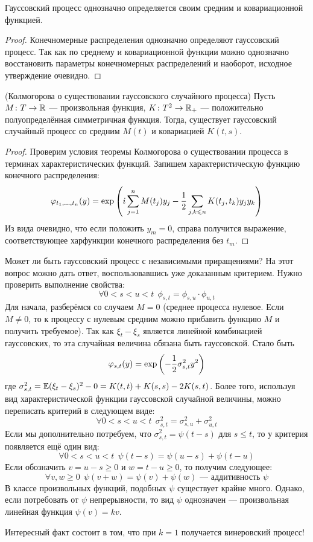 \begin{proposition}
	Гауссовский процесс однозначно определяется своим средним и ковариационной функцией.
\end{proposition}

\begin{proof}
	Конечномерные распределения однозначно определяют гауссовский процесс. Так как по среднему и ковариационной функции можно однозначно восстановить параметры конечномерных распределений и наоборот, исходное утверждение очевидно.
\end{proof}

\begin{theorem} (Колмогорова о существовании гауссовского случайного процесса)
	Пусть $M \colon T \to \mathbb{R}$ --- произвольная функция, $K \colon T^2 \to \mathbb{R}_+$ --- положительно полуопределённая симметричная функция. Тогда, существует гауссовский случайный процесс со средним $M(t)$ и ковариацией $K(t, s)$.
\end{theorem}

\begin{proof}
	Проверим условия теоремы Колмогорова о существовании процесса в терминах характеристических функций. Запишем характеристическую функцию конечного распределения:
	\[
	\varphi_{t_1, \ldots, t_n}(y) = \exp\left(i\sum_{j = 1}^n M(t_j)y_j - \frac{1}{2}\sum_{j, k \leqslant n} K(t_j, t_k)y_jy_k\right)
	\]
	Из вида очевидно, что если положить $y_m = 0$, справа получится выражение, соответствующее харфункции конечного распределения без $t_m$.
\end{proof}

\begin{note}
	Может ли быть гауссовский процесс с независимыми приращениями? На этот вопрос можно дать ответ, воспользовавшись уже доказанным критерием. Нужно проверить выполнение свойства:
	\[
	\forall 0 < s < u < t\ \ \phi_{s, t} = \phi_{s, u} \cdot \phi_{u, t}
	\]
	Для начала, разберёмся со случаем $M = 0$ (среднее процесса нулевое. Если $M \neq 0$, то к процессу с нулевым средним можно прибавить функцию $M$ и получить требуемое). Так как $\xi_t - \xi_s$ является линейной комбинацией гауссовских, то эта случайная величина обязана быть гауссовской. Стало быть
	\[
	\varphi_{s, t}(y) = \exp\left(-\frac{1}{2}\sigma_{s, t}^2y^2\right)
	\]
	где $\sigma_{s, t}^2 = \mathbb{E} (\xi_t - \xi_s)^2 - 0 = K(t, t) + K(s, s) - 2K(s, t)$. Более того, используя вид характеристической функции гауссовской случайной величины, можно переписать критерий в следующем виде:
	\[
	\forall 0 < s < u < t\ \ \sigma_{s, t}^2 = \sigma_{s, u}^2 + \sigma_{u, t}^2
	\]
	Если мы дополнительно потребуем, что $\sigma_{s, t}^2 = \psi(t - s)$ для $s \le t$, то у критерия появляется ещё один вид:
	\[
	\forall 0 < s < u < t\ \ \psi(t - s) = \psi(u - s) + \psi(t - u)
	\]
	Если обозначить $v = u - s \ge 0$ и $w = t - u \ge 0$, то получим следующее:
	\[
	\forall v, w \ge 0\ \ \psi(v + w) = \psi(v) + \psi(w) \text{ --- аддитивность $\psi$}
	\]
	В классе произвольных функций, подобных $\psi$ существует крайне много. Однако, если потребовать от $\psi$ непрерывности, то вид $\psi$ однозначен --- произвольная линейная функция $\psi(v) = kv$.
	
	Интересный факт состоит в том, что при $k = 1$ получается винеровский процесс!
\end{note}

